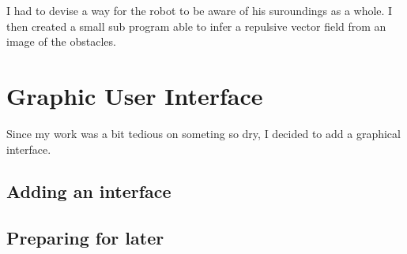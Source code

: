 I had to devise a way for the robot to be aware of his suroundings as a whole.
 I then created a small sub program able to infer a repulsive vector field from an image of the obstacles.


\section{Graphic User Interface}

Since my work was a bit tedious on someting so dry, I decided to add a graphical interface.

\subsection{Adding an interface}

\subsection{Preparing for later}
